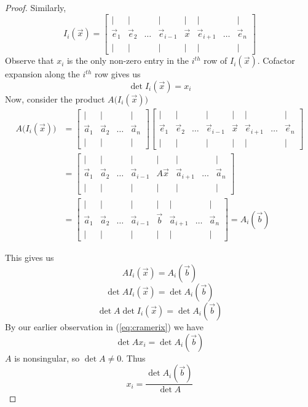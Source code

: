 \documentclass{ximera}
\begin{document}
\begin{proof}
Similarly,
$$I_i(\vec{x})=\begin{bmatrix}
           | & |& &|&|&|&&|\\
		\vec{e}_1 & \vec{e}_2&\dots &\vec{e}_{i-1}&\vec{x}&\vec{e}_{i+1}&\dots&\vec{e}_n\\
		| & |& &|&|&|&&|
         \end{bmatrix}$$
         Observe that $x_i$ is the only non-zero entry in the $i^{th}$ row of $I_i(\vec{x})$.  Cofactor expansion along the $i^{th}$ row gives us 
         \begin{equation}\label{eq:cramerix}\det{I_i(\vec{x})}=x_i\end{equation}
Now, consider the product $A\Big(I_i(\vec{x})\Big)$
\begin{align*}A\Big(I_i(\vec{x})\Big)&=\begin{bmatrix}
           | & |& &|\\
		\vec{a}_1 & \vec{a}_2&\dots&\vec{a}_n\\
		| & |& &|
         \end{bmatrix}\begin{bmatrix}
           | & |& &|&|&|&&|\\
		\vec{e}_1 & \vec{e}_2&\dots &\vec{e}_{i-1}&\vec{x}&\vec{e}_{i+1}&\dots&\vec{e}_n\\
		| & |& &|&|&|&&|
         \end{bmatrix}\\
         &=\begin{bmatrix}
           | & |& &|&|&|&&|\\
		\vec{a}_1 & \vec{a}_2&\dots &\vec{a}_{i-1}&A\vec{x}&\vec{a}_{i+1}&\dots&\vec{a}_n\\
		| & |& &|&|&|&&|
         \end{bmatrix}\\
         &=\begin{bmatrix}
           | & |& &|&|&|&&|\\
		\vec{a}_1 & \vec{a}_2&\dots &\vec{a}_{i-1}&\vec{b}&\vec{a}_{i+1}&\dots&\vec{a}_n\\
		| & |& &|&|&|&&|
         \end{bmatrix}=A_i(\vec{b})
\end{align*}

This gives us 
$$AI_i(\vec{x})=A_i(\vec{b})$$
$$\det{AI_i(\vec{x})}=\det{A_i(\vec{b})}$$
$$\det{A}\det{I_i(\vec{x})}=\det{A_i(\vec{b})}$$
By our earlier observation in (\ref{eq:cramerix}) we have
$$\det{A}x_i=\det{A_i(\vec{b})}$$
$A$ is nonsingular, so $\det{A}\neq 0$.  Thus
$$x_i=\frac{\det{A_i(\vec{b})}}{\det{A}}$$
\end{proof}
\end{document}
